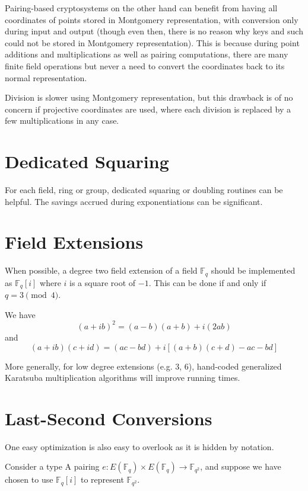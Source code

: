 Pairing-based cryptosystems on the other hand can benefit from having
all coordinates of points stored in Montgomery representation, with conversion
only during input and output (though even then, there is no reason why keys
and such could not be stored in Montgomery representation). This is because
during point additions and multiplications as well as pairing computations,
there are many finite field operations but never a need to convert the
coordinates back to its normal representation.

Division is slower using Montgomery representation, but this drawback is
of no concern if projective coordinates are used, where each division is
replaced by a few multiplications in any case.

\section{Dedicated Squaring}

For each field, ring or group, dedicated squaring or doubling routines
can be helpful. The savings accrued during exponentiations can be significant.

\section{Field Extensions}

When possible, a degree two field extension of a field $\mathbb{F}_q$
should be implemented as $\mathbb{F}_q[i]$ where $i$ is a square root of $-1$.
This can be done if and only if $q = 3 \pmod{4}$.

We have
\[ (a + i b)^2 = (a - b)(a + b) + i (2 a b) \]
and
\[ (a + i b)(c + i d) = (ac - bd) + i[(a + b)(c + d) - ac - bd] \]

More generally, for low degree extensions (e.g. 3, 6),
hand-coded generalized Karatsuba multiplication algorithms \cite{wpkaratsuba}
will improve running times.

\section{Last-Second Conversions}

One easy optimization is also easy to overlook as it is hidden by
notation.

Consider a type A pairing $e : E(\mathbb{F}_q) \times E(\mathbb{F}_q)
\rightarrow \mathbb{F}_{q^2}$, and suppose we have chosen to
use $\mathbb{F}_q [i]$ to represent $\mathbb{F}_{q^2}$.

